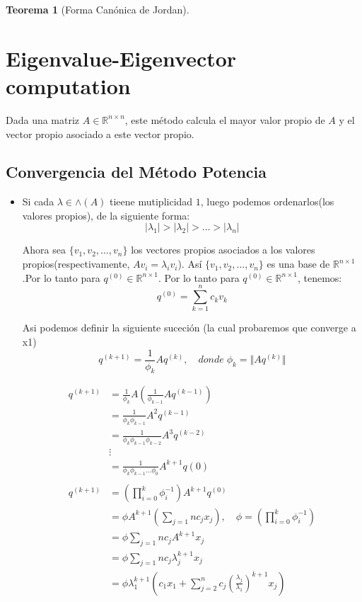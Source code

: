 \documentclass[10pt,a4paper]{article}
\newtheorem{mytheo}{Teorema}[section]
\newcommand{\ds}{\displaystyle}
\begin{document}
\begin{mytheo}[Forma Canónica de Jordan]

\end{mytheo}


\section{Eigenvalue-Eigenvector computation}
Dada una matriz $A\in \mathbb{R}^{n\times n}$, este método calcula el mayor valor propio de $A$ y el vector propio asociado a este vector propio.

\subsection{Convergencia del Método Potencia}
\begin{itemize}
	\item Si cada $\lambda\in\wedge (A)$ tieene mutiplicidad $1$, luego podemos ordenarlos(los valores propios), de la siguiente forma:
	$$\vert \lambda_{1}\vert >\vert\lambda_{2}\vert >\ldots >\vert\lambda_{n}\vert$$
	
	Ahora sea $\{v_{1}, v_{2},\ldots, v_{n}\}$ los vectores propios asociados a los valores propios(respectivamente, $Av_{i} = \lambda_{i}v_{i}$). Así $\{v_{1}, v_{2},\ldots, v_{n}\}$ es una base de $\mathbb{R}^{n\times 1}$.Por lo tanto para $q^{(0)}\in\mathbb{R}^{n\times 1}$. Por lo tanto para $q^{(0)}\in\mathbb{R}^{n\times 1}$, tenemos:
	$$q^{(0)} = \sum_{k=1}^{n}c_{k}v_{k}$$
	
Asi podemos definir la siguiente suceción (la cual probaremos que converge a x1)
$$q^{(k+1)} = \frac{1}{\phi_{k}}Aq^{(k)},\quad donde\;\phi_{k} = \Vert Aq^{(k)}\Vert$$

\begin{align*}
	q^{(k+1)} &= \frac{1}{\phi_{k}}A\left(\frac{1}{\phi_{k-1}}Aq^{(k-1)}\right)\\
		&= \frac{1}{\phi_{k}\phi_{k-1}}A^{2}q^{(k-1)}\\
		&= \frac{1}{\phi_{k}\phi_{k-1}\phi_{k-2}}A^{3}q^{(k-2)}\\
		&\vdots\\
		&= \frac{1}{\phi_{k}\phi_{k-1}\ldots\phi_{0}}A^{k+1}q{(0)}\\\\
	q^{(k+1)} &= \left(\prod_{i=0}^{k}\phi_{i}^{-1}\right)A^{k+1}q^{(0)}\\
		&= \phi A^{k+1}\left(\ds\sum_{j=1}{n}c_{j}x_{j}\right),\quad\phi = \left(\prod_{i=0}^{k}\phi_{i}^{-1}\right)\\
		&= \phi \ds\sum_{j=1}{n}c_{j}A^{k+1}x_{j}\\
		&= \phi \ds\sum_{j=1}{n}c_{j}\lambda_{j}^{k+1}x_{j}\\
		&= \phi\lambda_{1}^{k+1}\left(c_{1}x_{1} + \ds\sum_{j=2}^{n}c_{j}\left(\frac{\lambda_{j}}{\lambda_{1}}\right)^{k+1}x_{j}\right)
\end{align*}



\end{itemize}
\end{document}

